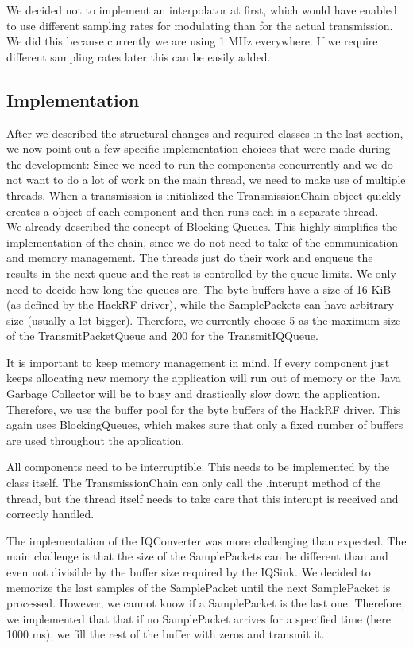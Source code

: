 We decided not to implement an interpolator at first, which would have enabled to use different sampling rates for modulating than for the actual transmission. We did this because currently we are using 1 MHz everywhere. If we require different sampling rates later this can be easily added. 

\subsection{Implementation}

After we described the structural changes and required classes in the last section, we now point out a few specific implementation choices that were made during the development: 
Since we need to run the components concurrently and we do not want to do a lot of work on the main thread, we need to make use of multiple threads. When a transmission is initialized the TransmissionChain object quickly creates a object of each component and then runs each in a separate thread. \\
We already described the concept of Blocking Queues. This highly simplifies the implementation of the chain, since we do not need to take of the communication and memory management. The threads just do their work and enqueue the results in the next queue and the rest is controlled by the queue limits. We only need to decide how long the queues are. The byte buffers have a size of 16 KiB (as defined by the HackRF driver), while the SamplePackets can have arbitrary size (usually a lot bigger). Therefore, we currently choose 5 as the maximum size of the TransmitPacketQueue and 200 for the TransmitIQQueue.  
	
It is important to keep memory management in mind. If every component just keeps allocating new memory the application will run out of memory or the Java Garbage Collector will be to busy and drastically slow down the application. Therefore, we use the buffer pool for the byte buffers of the HackRF driver. This again uses BlockingQueues, which makes sure that only a fixed number of buffers are used throughout the application.  
	
All components need to be interruptible. This needs to be implemented by the class itself. The TransmissionChain can only call the .interupt method of the thread, but the thread itself needs to take care that this interupt is received and correctly handled. 
	
The implementation of the IQConverter was more challenging than expected. The main challenge is that the size of the SamplePackets can be different than and even not divisible by the buffer size required by the IQSink. We decided to memorize the last samples of the SamplePacket until the next SamplePacket is processed. However, we cannot know if a SamplePacket is the last one. Therefore, we implemented that that if no SamplePacket arrives for a specified time (here 1000 ms), we fill the rest of the buffer with zeros and transmit it. 


